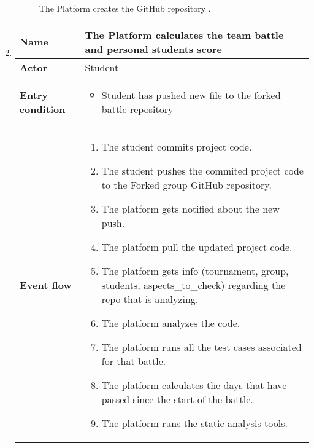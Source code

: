 \begin{enumerate}[label=\textbf{UC\arabic*}:,leftmargin=1.3cm]
          \begin{figure}[H]
              \centering
              \caption{The Platform creates the GitHub repository   .}
              \label{fig:Battle registration deadline}
          \end{figure}
          \pagebreak
    \item \textbf{}
          \begin{table}[H]
              \centering
              \begin{tabular}{|l|p{11.9cm}|}
                  \hline
                  \textbf{Name}            & The Platform calculates the team battle and personal students score                    \\\hline
                  \textbf{Actor}           & Student                                                                               \\\hline
                  \textbf{Entry condition} &
                  \begin{itemize}
                      \item Student has pushed new file to the forked battle repository
                  \end{itemize}                                                \\\hline
                  \textbf{Event flow}      &
                  \begin{enumerate}[label=\arabic*.]
                      \item The student commits project code.
                      \item The student pushes the commited project code to the Forked group GitHub repository.
                      \item The platform gets notified about the new push.
                      \item The platform pull the updated project code.
                      \item The platform gets info (tournament, group, students, aspects_to_check) regarding the repo that is analyzing.
                      \item The platform analyzes the code.
                      \item The platform runs all the test cases associated for that battle.
                      \item The platform calculates the days that have passed since the start of the battle.
                      \item The platform runs the static analysis tools.

\end{enumerate}
\end{tabular}
\end{table}
\end{enumerate}
